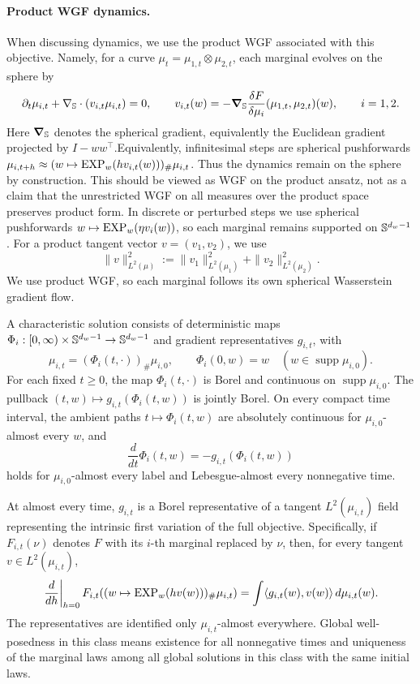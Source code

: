 \paragraph{Product WGF dynamics.}
When discussing dynamics, we use the product WGF associated with this objective. Namely, for a curve
\(\mu_t=\mu_{1,t}\otimes\mu_{2,t}\), each marginal evolves on the sphere by
\begin{equation}
    \partial_t\mu_{i,t}
    +\nabla_{\mathbb{S}}\cdot(v_{i,t}\mu_{i,t})=0,
    \qquad
    v_{i,t}(w)
    =
    -\grad_{\mathbb{S}}
    \frac{\delta F}{\delta \mu_i}(\mu_{1,t},\mu_{2,t})(w),
    \qquad i=1,2.
\end{equation}
Here \(\grad_{\mathbb{S}}\) denotes the spherical gradient, equivalently the Euclidean gradient projected by \(I-ww^\top\).Equivalently, infinitesimal steps are spherical pushforwards
\(\mu_{i,t+h}\approx (w\mapsto \mathrm{EXP}_w(hv_{i,t}(w)))_\#\mu_{i,t}\).
Thus the dynamics remain on the sphere by construction. This should be viewed as WGF on the product ansatz, not as a claim that the unrestricted WGF on all measures over the product space preserves product form. In discrete or perturbed steps we use spherical pushforwards
\(w\mapsto \mathrm{EXP}_w(\eta v_i(w))\), so each marginal remains supported on \(\mathbb{S}^{d_w-1}\).
For a product tangent vector \(v=(v_1,v_2)\), we use
\[
    \|v\|_{L^2(\mu)}^2
    :=
    \|v_1\|_{L^2(\mu_1)}^2+
    \|v_2\|_{L^2(\mu_2)}^2.
\]
We use product WGF, so each marginal follows its own spherical Wasserstein gradient flow.

\begin{definition}
\label{def:mf-characteristic-solution}
A characteristic solution consists of deterministic maps
\(\Phi_i:[0,\infty)\times\mathbb{S}^{d_w-1}\to\mathbb{S}^{d_w-1}\)
and gradient representatives \(g_{i,t}\), with
\[
 \mu_{i,t}=(\Phi_i(t,\cdot))_\#\mu_{i,0},
 \qquad
 \Phi_i(0,w)=w
 \quad(w\in\operatorname{supp}\mu_{i,0}).
\]
For each fixed \(t\ge0\), the map \(\Phi_i(t,\cdot)\) is Borel
and continuous on \(\operatorname{supp}\mu_{i,0}\).
The pullback \((t,w)\mapsto g_{i,t}(\Phi_i(t,w))\) is jointly Borel.
On every compact time interval, the ambient paths
\(t\mapsto\Phi_i(t,w)\) are absolutely continuous for
\(\mu_{i,0}\)-almost every \(w\), and
\[
 \frac{d}{dt}\Phi_i(t,w)=-g_{i,t}(\Phi_i(t,w))
\]
holds for \(\mu_{i,0}\)-almost every label and Lebesgue-almost every
nonnegative time.

At almost every time, \(g_{i,t}\) is a Borel representative of a tangent
\(L^2(\mu_{i,t})\) field representing the intrinsic first variation of the
full objective. Specifically, if \(F_{i,t}(\nu)\) denotes \(F\) with its
\(i\)-th marginal replaced by \(\nu\), then, for every tangent
\(v\in L^2(\mu_{i,t})\),
\[
 \left.\frac{d}{dh}\right|_{h=0}
 F_{i,t}\!\left((w\mapsto\mathrm{EXP}_w(hv(w)))_\#\mu_{i,t}\right)
 =\int\langle g_{i,t}(w),v(w)\rangle\,d\mu_{i,t}(w).
\]
The representatives are identified only \(\mu_{i,t}\)-almost everywhere.
Global well-posedness in this class means existence for all nonnegative times
and uniqueness of the marginal laws among all global solutions in this class
with the same initial laws.
\end{definition}


